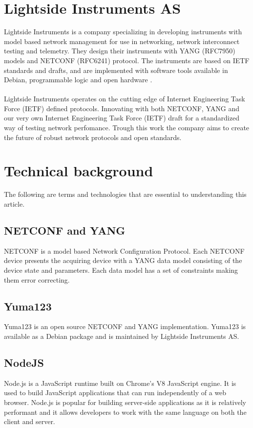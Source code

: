 \documentclass[12pt]{article}
\begin{document}
\section{Lightside Instruments AS}
Lightside Instruments is a company specializing in developing instruments with model based network management 
for use in networking, network interconnect testing and telemetry. 
They design their instruments with YANG (RFC7950) \cite{bjorklundYANG11Data2016} models and NETCONF (RFC6241) \cite{ennsNetworkConfigurationProtocol2011} protocol. 
The instruments are based on IETF standards and drafts, 
and are implemented with software tools available in Debian, programmable 
logic and open hardware \cite{LightsideInstrumentsYANG}.
\\
\\
Lightside Instruments operates on the cutting edge of Internet Engineering Task Force (IETF) defined protocols. Innovating with both NETCONF, YANG and
our very own Internet Engineering Task Force (IETF) draft for a standardized way of testing network perfomance. Trough this work 
the company aims to create the future of robust network protocols and open standards.


\section{Technical background}
The following are terms and technologies that are essential to understanding this article.

\subsection{NETCONF and YANG}
NETCONF \cite{ennsNetworkConfigurationProtocol2011} is a model based Network Configuration Protocol.
Each NETCONF device presents the acquiring device with a YANG \cite{bjorklundYANG11Data2016} data model
consisting of the device state and parameters. 
Each data model has a set of constraints making them error correcting.

\subsection{Yuma123}
Yuma123 \cite{vassilevVlvassilevYuma1232025} is an open source NETCONF and YANG implementation.
Yuma123 is available as a Debian package and is maintained by Lightside Instruments AS.

\subsection{NodeJS}
Node.js \cite{NodejsRunJavaScript} is a JavaScript runtime built on Chrome's V8 JavaScript engine.
It is used to build JavaScript applications that can run independently of a web browser.
Node.js is popular for building server-side applications as it is relatively performant and 
it allows developers to work with the same language on both the client and server.
\end{document}
